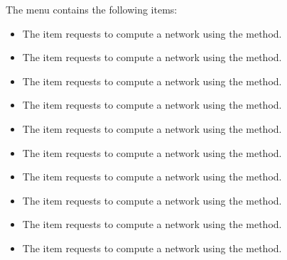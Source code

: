 \documentclass[11pt]{article}
\begin{document}
The  menu contains the following items:
\begin{itemize}
\item The  item
requests to compute a network using the  method.
\item The  item
requests to compute a network using the  method.
\item The  item
requests to compute a network using the  method.
\item The  item
requests to compute a network using the  method.
\item The  item
requests to compute a network using the  method.
\item The  item
requests to compute a network using the  method.
\item The  item
requests to compute a network using the  method.
\item The  item
requests to compute a network using the  method.
\item The  item
requests to compute a network using the  method.
\item The  item
requests to compute a network using the  method.
\end{itemize}
\end{document}
